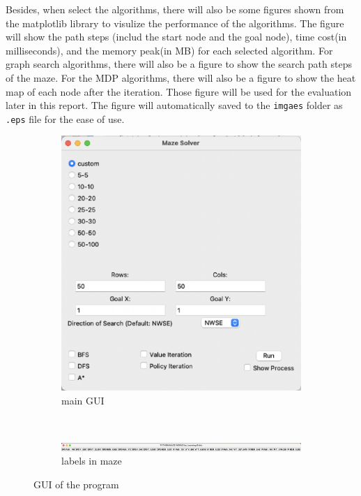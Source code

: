 \documentclass{article}
\begin{document}
 Besides, when select the algorithms, there will also be some figures shown from the matplotlib library to visulize the performance of the algorithms. The figure will show the path steps (includ the start node and the goal node), time cost(in milliseconds), and the memory peak(in MB) for each selected algorithm. For graph search algorithms, there will also be a figure to show the search path steps of the maze. For the MDP algorithms, there will also be a figure to show the heat map of each node after the iteration.
 Those figure will be used for the evaluation later in this report. The figure will automatically saved to the \texttt{imgaes} folder as \texttt{.eps} file for the ease of use.
 \begin{figure}[htbp]
    \centering
    \begin{subfigure}{0.34\textwidth}

        \includegraphics[width=\textwidth]{imgs/mainGUI.eps}
        \caption{main GUI}
    \end{subfigure}
    \\
    \begin{subfigure}{1.0\textwidth}
        \centering
        \includegraphics[width=\textwidth]{imgs/label.eps}
        \caption{labels in maze}
    \end{subfigure}
    \caption{GUI of the program}
\end{figure}
\end{document}
